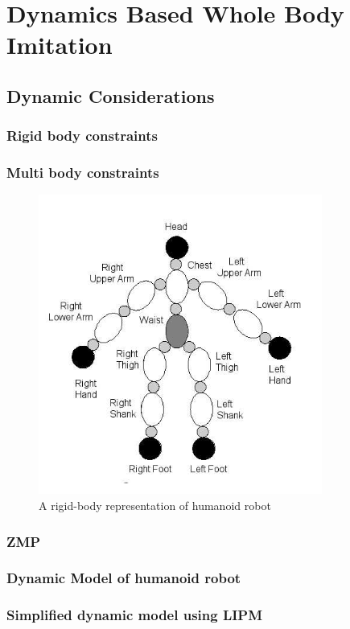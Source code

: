 \chapter{Dynamics Based Whole Body Imitation}

\section{Dynamic Considerations}
\subsection{Rigid body constraints}
\subsection{Multi body constraints}

\begin{figure}[h!]
    \centering
    \includegraphics[scale=0.175]{images/humanoid-rigid-bodies.png}\hfill
    \caption{A rigid-body representation of humanoid robot}\hfill
    \label{humanoid-rigid-body}
\end{figure}

\subsection{ZMP}
\subsection{Dynamic Model of humanoid robot}
\subsection{Simplified dynamic model using LIPM}

